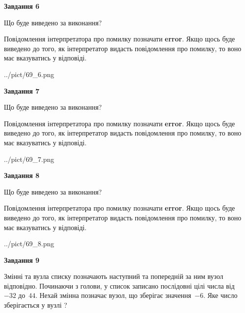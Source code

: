 \documentclass[12pt, ukrainian]{article}
\begin{document}
{\begin {large}
{\begin {center}\textbf{Завдання 6}\end {center}}\par
Що буде виведено за виконання?

Повідомлення інтерпретатора про помилку позначати \textbf{error}.
Якщо щось буде виведено до того, як інтерпретатор видасть повідомлення про помилку, 
то воно має вказуватись у відповіді. \par


\begin{center}
	{../pict/69_6.png}
\end{center}
\newpage

{\begin {center}\textbf{Завдання 7}\end {center}}\par
Що буде виведено за виконання?

Повідомлення інтерпретатора про помилку позначати \textbf{error}.
Якщо щось буде виведено до того, як інтерпретатор видасть повідомлення про помилку, 
то воно має вказуватись у відповіді. \par


\begin{center}
	{../pict/69_7.png}
\end{center}
\newpage

{\begin {center}\textbf{Завдання 8}\end {center}}\par
Що буде виведено за виконання?

Повідомлення інтерпретатора про помилку позначати \textbf{error}.
Якщо щось буде виведено до того, як інтерпретатор видасть повідомлення про помилку, 
то воно має вказуватись у відповіді. \par


\begin{center}
	{../pict/69_8.png}
\end{center}
\newpage

{\begin {center}\textbf{Завдання 9}\end {center}}\par
Змінні  та  вузла списку позначають наступний та попередній за ним вузол відповідно. Починаючи з голови, у список записано послідовні цілі числа від~$-32$ до~$44$. Нехай змінна  позначає вузол, що зберігає значення~$-6$.
Яке число зберігається у вузлі  ?\par
\newpage


\end{large}}
\end{document}
